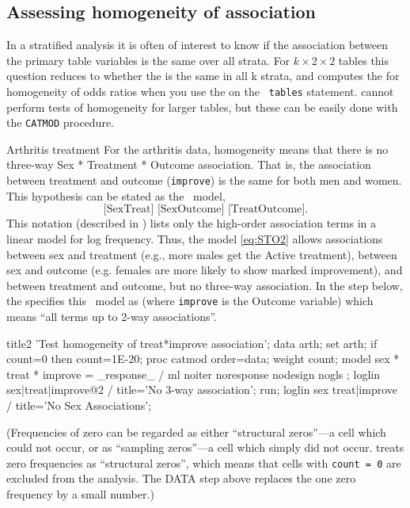 \subsection{Assessing homogeneity of association}
In a stratified analysis
it is often of interest to know if the association between the
primary table variables is the same over all strata.  For \(k \times
2 \times  2\) tables this question reduces to whether the  is
the same in all k strata, and  computes the 
for homogeneity of odds ratios
when you use the  on the {\tt
tables} statement.   cannot perform tests of homogeneity for
larger tables, but these can be easily done with the \texttt{CATMOD}
procedure.

\begin{Example}[arthrit4]{Arthritis treatment}
For the arthritis data, homogeneity means that there is no three-way
Sex * Treatment * Outcome association.  That is, the association
between treatment and outcome (\texttt{improve})
is the same for both men and women.
This hypothesis can be stated
as the \loglin\ model,
\begin{equation}\label{eq:STO2}
 \textrm{[SexTreat] [SexOutcome] [TreatOutcome]}
 \period
\end{equation}
This notation (described in )
lists only the high-order association
terms in a linear model for log frequency.
Thus, the model \eqref{eq:STO2}
allows associations between sex and treatment (e.g., more males
get the Active treatment), between sex and outcome (e.g. females
are more likely to show marked improvement),
and between treatment and outcome,
but no three-way association.
In the  step
below, the  specifies this \loglin\  model
as  (where \texttt{improve} is the Outcome variable)
which means ``all terms up to 2-way
associations''.

\begin{listing}
title2 'Test homogeneity of treat*improve association';
data arth;
   set arth;
   if count=0 then count=1E-20;
proc catmod order=data;
   weight count;
   model sex * treat * improve = _response_ /
         ml noiter noresponse nodesign nogls ;
   loglin sex|treat|improve@2 / title='No 3-way association';
run;
   loglin sex treat|improve   / title='No Sex Associations';
\end{listing}

(Frequencies of zero can be regarded as either ``structural
zeros''---a cell which could not occur, or as ``sampling zeros''---a
cell which simply did not occur.   treats zero frequencies
as ``structural zeros'', which means that cells with \texttt{count = 0}
are excluded from the analysis.  The DATA step above replaces the one
zero frequency by a small number.)


\end{Example}
